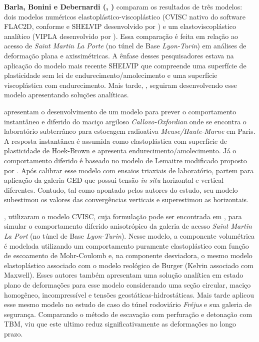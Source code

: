 \textbf{Barla, Bonini e Debernardi (\citeyear{Barla2008}, \citeyear{Barla2010})} comparam os resultados de três modelos: dois modelos numéricos elastoplástico-viscoplástico (CVISC nativo do software FLAC2D, conforme  e SHELVIP desenvolvido por ) e um elastoviscoplástico analítico (VIPLA desenvolvido por ). Essa comparação é feita em relação ao acesso de \textit{Saint Martin La Porte} (no túnel de Base \textit{Lyon-Turin}) em análises de deformação plana e axissimétricas. A ênfase desses pesquisadores estava na aplicação do modelo mais recente SHELVIP que compreende uma superfície de plasticidade sem lei de endurecimento/amolecimento e uma superfície viscoplástica com endurecimento. Mais tarde, , seguiram desenvolvendo esse modelo apresentando soluções analíticas.

\textbf{} apresentam o desenvolvimento de um modelo para prever o comportamento instantâneo e diferido do maciço argiloso \textit{Callovo-Oxfordian} onde se encontra o laboratório subterrâneo para estocagem radioativa \textit{Meuse/Haute-Marne} em Paris. A resposta instantânea é assumida como elastoplástica com superfície de plasticidade de Hoek-Brown e apresenta endurecimento/amolecimento. Já o comportamento diferido é baseado no modelo de Lemaitre modificado proposto por . Após calibrar esse modelo com ensaios triaxiais de laboratório, partem para aplicação da galeria GED que possui tensão \textit{in situ} horizontal e vertical diferentes. Contudo, tal como apontado pelos autores do estudo, seu modelo subestimou os valores das convergências verticais e superestimou as horizontais.

\textbf{}, utilizaram o modelo CVISC, cuja formulação pode ser encontrada em , para simular o comportamento diferido anisotrópico da galeria de acesso \textit{Saint Martin La Port} (no túnel de Base \textit{Lyon-Turin}). Nesse modelo, a componente volumétrica é modelada utilizando um comportamento puramente elastoplástico com função de escoamento de Mohr-Coulomb e, na componente desviadora, o mesmo modelo elastoplástico associado com o modelo reológico de Burger (Kelvin associado com Maxwell). Esses autores também apresentam uma solução analítica em estado plano de deformações para esse modelo considerando uma seção circular, maciço homogêneo, incompressível e tensões geostáticas-hidrostáticas. Mais tarde  aplicou esse mesmo modelo no estudo de caso do túnel rodoviário \textit{Fréjus} e sua galeria de segurança. Comparando o método de escavação com perfuração e detonação com TBM, viu que este ultimo reduz significativamente as deformações no longo prazo.

